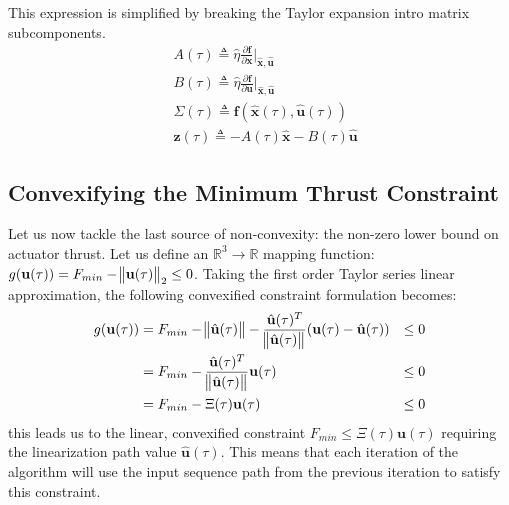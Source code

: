 \documentclass[conf]{new-aiaa}
\begin{document}
This expression is simplified by breaking the Taylor expansion intro matrix subcomponents. 
\begin{align}
& A(\tau) \triangleq \hat{\eta} \frac{\partial \mathbf{f}}{\partial \mathbf{x}}  \bigg\rvert_{\mathbf{\hat{x}}, \mathbf{\hat{u}}} \\
& B(\tau) \triangleq \hat{\eta} \frac{\partial \mathbf{f}}{\partial \mathbf{u}}  \bigg\rvert_{\mathbf{\hat{x}}, \mathbf{\hat{u}}} \\
& \Sigma(\tau) \triangleq \mathbf{f}(\hat{\mathbf{x}}(\tau), \hat{\mathbf{u}}(\tau)) \\
& \mathbf{z}(\tau) \triangleq -A(\tau)\mathbf{\hat{x}}- B(\tau)\mathbf{\hat{u}}
\end{align}





\subsection{Convexifying the Minimum Thrust Constraint}
Let us now tackle the last source of non-convexity: the non-zero lower bound on actuator thrust. Let us define an $\mathbb{R}^3 \rightarrow \mathbb{R}$ mapping function: $g(\mathbf{u}(\tau)) = F_{min} - \norm{\mathbf{u}(\tau)}_2 \leq 0$. Taking the first order Taylor series linear approximation, the following convexified constraint formulation becomes:
%
\begin{align}
	g(\mathbf{u}(\tau)) &= F_{min} - \norm{\hat{\mathbf{u}}(\tau)} - \frac{\hat{\mathbf{u}}(\tau)^T}{\norm{\hat{\mathbf{u}}(\tau)}}(\mathbf{u}(\tau) - \hat{\mathbf{u}}(\tau)) & \leq 0 \\
	&= F_{min} - \frac{\hat{\mathbf{u}}(\tau)^T}{\norm{\hat{\mathbf{u}}(\tau)}} \mathbf{u}(\tau)  & \leq 0\\
	&= F_{min} - \Xi(\tau)\mathbf{u}(\tau)  & \leq 0
\end{align}
this leads us to the linear, convexified constraint $F_{min} \leq \Xi(\tau)\mathbf{u}(\tau)$ requiring the linearization path value $\hat{\mathbf{u}}(\tau)$. This means that each iteration of the algorithm will use the input sequence path from the previous iteration to satisfy this constraint.
\end{document}
